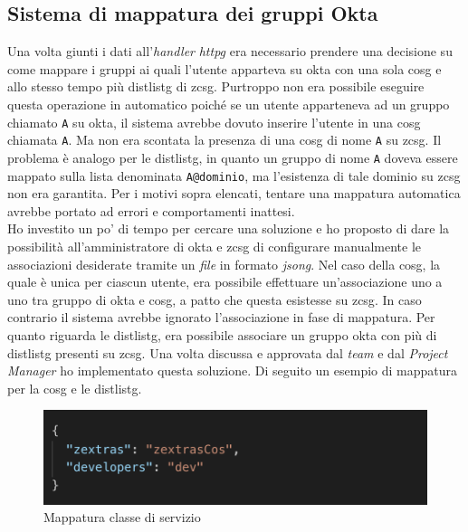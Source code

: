 \subsection{Sistema di mappatura dei gruppi Okta}
Una volta giunti i dati all'\textit{handler} \textit{\gls{httpg}} era necessario prendere una decisione su come mappare i gruppi ai quali l'utente apparteva su \gls{okta} con una sola \gls{cosg} e allo stesso tempo più \gls{distlistg} di \gls{zcsg}. Purtroppo non era possibile eseguire questa operazione in automatico poiché se un utente apparteneva ad un gruppo chiamato \texttt{A} su \gls{okta}, il sistema avrebbe dovuto inserire l'utente in una \gls{cosg} chiamata \texttt{A}. Ma non era scontata la presenza di una \gls{cosg} di nome \texttt{A} su \gls{zcsg}. Il problema è analogo per le \gls{distlistg}, in quanto un gruppo di nome \texttt{A} doveva essere mappato sulla lista denominata \texttt{A@dominio}, ma l'esistenza di tale dominio su \gls{zcsg} non era garantita. Per i motivi sopra elencati, tentare una mappatura automatica avrebbe portato ad errori e comportamenti inattesi. \\
Ho investito un po' di tempo per cercare una soluzione e ho proposto di dare la possibilità all'amministratore di \gls{okta} e \gls{zcsg} di configurare manualmente le associazioni desiderate tramite un \textit{file} in formato \textit{\gls{jsong}}. Nel caso della \gls{cosg}, la quale è unica per ciascun utente, era possibile effettuare un'associazione uno a uno tra gruppo di \gls{okta} e \gls{cosg}, a patto che questa esistesse su \gls{zcsg}. In caso contrario il sistema avrebbe ignorato l'associazione in fase di mappatura. Per quanto riguarda le \gls{distlistg}, era possibile associare un gruppo \gls{okta} con più di \gls{distlistg} presenti su \gls{zcsg}.
Una volta discussa e approvata dal \textit{team} e dal \textit{Project Manager} ho implementato questa soluzione. Di seguito un esempio di mappatura per la \gls{cosg} e le \gls{distlistg}.

    \begin{figure}[ht]
        \centering
        \includegraphics[width=1\textwidth]{immagini/cosMapping.png}
        \caption{Mappatura classe di servizio}
        \label{fig: Mappatura classe di servizio}
    \end{figure}
    
